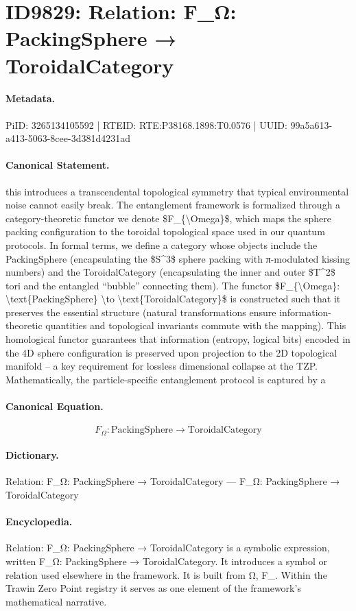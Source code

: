 \section*{ID9829: Relation: F\_Ω: PackingSphere → ToroidalCategory}
\paragraph{Metadata.}
PiID: 3265134105592 | RTEID: RTE:P38168.1898:T0.0576 | UUID: 99a5a613-a413-5063-8cee-3d381d4231ad

\paragraph{Canonical Statement.}
this introduces a transcendental topological symmetry that typical environmental noise cannot easily break. The entanglement framework is formalized through a category-theoretic functor we denote \$F\_\{\textbackslash{}Omega\}\$, which maps the sphere packing configuration to the toroidal topological space used in our quantum protocols. In formal terms, we define a category whose objects include the PackingSphere (encapsulating the \$S\textasciicircum{}3\$ sphere packing with π-modulated kissing numbers) and the ToroidalCategory (encapsulating the inner and outer \$T\textasciicircum{}2\$ tori and the entangled “bubble” connecting them). The functor \$F\_\{\textbackslash{}Omega\}: \textbackslash{}text\{PackingSphere\} \textbackslash{}to \textbackslash{}text\{ToroidalCategory\}\$ is constructed such that it preserves the essential structure (natural transformations ensure information-theoretic quantities and topological invariants commute with the mapping). This homological functor guarantees that information (entropy, logical bits) encoded in the 4D sphere configuration is preserved upon projection to the 2D topological manifold – a key requirement for lossless dimensional collapse at the TZP. Mathematically, the particle-specific entanglement protocol is captured by a

\paragraph{Canonical Equation.}
\[
F_{\Omega}: \text{PackingSphere} \to \text{ToroidalCategory}
\]

\paragraph{Dictionary.}
Relation: F\_Ω: PackingSphere → ToroidalCategory — F\_Ω: PackingSphere → ToroidalCategory

\paragraph{Encyclopedia.}
Relation: F\_Ω: PackingSphere → ToroidalCategory is a symbolic expression, written F\_Ω: PackingSphere → ToroidalCategory. It introduces a symbol or relation used elsewhere in the framework. It is built from Ω, F\_. Within the Trawin Zero Point registry it serves as one element of the framework's mathematical narrative.

